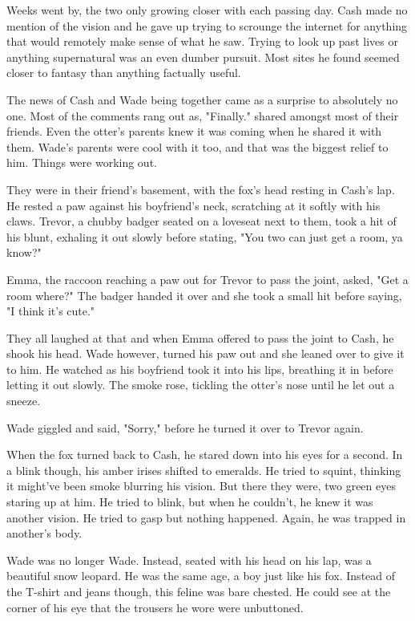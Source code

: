 \secdiv

Weeks went by, the two only growing closer with each passing day. Cash made no mention of the vision and he gave up trying to scrounge the internet for anything that would remotely make sense of what he saw. Trying to look up past lives or anything supernatural was an even dumber pursuit. Most sites he found seemed closer to fantasy than anything factually useful.

The news of Cash and Wade being together came as a surprise to absolutely no one. Most of the comments rang out as, "Finally." shared amongst most of their friends. Even the otter's parents knew it was coming when he shared it with them. Wade's parents were cool with it too, and that was the biggest relief to him. Things were working out.

They were in their friend's basement, with the fox's head resting in Cash's lap. He rested a paw against his boyfriend's neck, scratching at it softly with his claws. Trevor, a chubby badger seated on a loveseat next to them, took a hit of his blunt, exhaling it out slowly before stating, "You two can just get a room, ya know?"

Emma, the raccoon reaching a paw out for Trevor to pass the joint, asked, "Get a room where?" The badger handed it over and she took a small hit before saying, "I think it's cute."

They all laughed at that and when Emma offered to pass the joint to Cash, he shook his head. Wade however, turned his paw out and she leaned over to give it to him. He watched as his boyfriend took it into his lips, breathing it in before letting it out slowly. The smoke rose, tickling the otter's nose until he let out a sneeze.

Wade giggled and said, "Sorry," before he turned it over to Trevor again.

When the fox turned back to Cash, he stared down into his eyes for a second. In a blink though, his amber irises shifted to emeralds. He tried to squint, thinking it might've been smoke blurring his vision. But there they were, two green eyes staring up at him. He tried to blink, but when he couldn't, he knew it was another vision. He tried to gasp but nothing happened. Again, he was trapped in another's body.

Wade was no longer Wade. Instead, seated with his head on his lap, was a beautiful snow leopard. He was the same age, a boy just like his fox. Instead of the T-shirt and jeans though, this feline was bare chested. He could see at the corner of his eye that the trousers he wore were unbuttoned.

